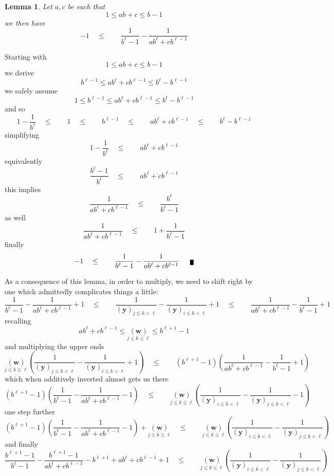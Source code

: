 \documentclass[twoside]{article}
\renewcommand{\leq}{\ensuremath{\quad\le\qquad}}
\newcommand{\bradix}[2][u]{\ensuremath{\underset{#2}{(\bm{#1})}}}
\newcommand{\denom}[3][y]{\ensuremath{(\bm{#1})_{#2\le k <  #3}}}
\newtheorem{lemma}{Lemma}[section]
\newenvironment{proof}[1][Proof]{\begin{trivlist}
\item[\hskip \labelsep {\bfseries #1}]}{\end{trivlist}}
\newcommand{\qed}{\nobreak \ifvmode \relax \else
      \ifdim\lastskip<1.5em \hskip-\lastskip
      \hskip1.5em plus0em minus0.5em \fi \nobreak
      \vrule height0.5em width0.5em depth0.25em\fi}
\begin{document}
\newpage

\begin{lemma}
Let $ a,c $ be such that
$$ 1\le ab+c\le b-1 $$
we then have
$$ -1\leq\frac{1}{b^\ell-1}-\frac{1}{ab^\ell+cb^{\ell-1}} $$
\end{lemma}

\begin{proof}
Starting with
$$ 1\le ab+c\le b-1 $$
we derive
$$ b^{\ell-1}\le ab^\ell+cb^{\ell-1}\le b^\ell-b^{\ell-1} $$
we safely assume
$$ 1\le b^{\ell-1}\le ab^\ell+cb^{\ell-1}\le b^\ell-b^{\ell-1} $$
and so
$$ 1-\frac{1}{b^\ell}\leq 1\leq b^{\ell-1}\leq ab^\ell+cb^{\ell-1}\leq b^\ell-b^{\ell-1} $$
simplifying
$$ 1-\frac{1}{b^\ell}\leq ab^\ell+cb^{\ell-1} $$
equivalently
$$ \frac{b^\ell-1}{b^\ell}\leq ab^\ell+cb^{\ell-1} $$
this implies
$$ \frac{1}{ab^\ell+cb^{\ell-1}}\leq \frac{b^\ell}{b^\ell-1} $$
as well
$$ \frac{1}{ab^\ell+cb^{\ell-1}}\leq 1+\frac{1}{b^\ell-1} $$
finally
$$ -1\leq \frac{1}{b^\ell-1}-\frac{1}{ab^\ell+cb^{\ell-1}}\qed $$
\end{proof}

As a consequence of this lemma, in order to multiply, we need to shift right by one which admittedly complicates things a little:
$$ \frac{1}{b^\ell-1}-\frac{1}{ab^\ell+cb^{\ell-1}}+1
	\leq\frac{1}{\denom{j}{\ell}}-\frac{1}{\denom{i}{\ell}}+1
	\leq\frac{1}{ab^\ell+cb^{\ell-1}}-\frac{1}{b^\ell-1}+1 $$
recalling
$$ ab^\ell+cb^{\ell-1}\le\bradix[w]{j\le k\le\ell}\le b^{\ell+1}-1 $$
and multiplying the upper ends
$$ \bradix[w]{j\le k\le\ell}\left(\frac{1}{\denom{j}{\ell}}-\frac{1}{\denom{i}{\ell}}+1\right)
	\leq\left(b^{\ell+1}-1\right)\left(\frac{1}{ab^\ell+cb^{\ell-1}}-\frac{1}{b^\ell-1}+1\right) $$
which when additively inverted almost gets us there
$$ \left(b^{\ell+1}-1\right)\left(\frac{1}{b^\ell-1}-\frac{1}{ab^\ell+cb^{\ell-1}}-1\right)
	\leq\bradix[w]{j\le k\le\ell}\left(\frac{1}{\denom{i}{\ell}}-\frac{1}{\denom{j}{\ell}}-1\right) $$
one step further
$$ \left(b^{\ell+1}-1\right)\left(\frac{1}{b^\ell-1}-\frac{1}{ab^\ell+cb^{\ell-1}}-1\right)+\bradix[w]{j\le k\le\ell}
	\leq\bradix[w]{j\le k\le\ell}\left(\frac{1}{\denom{i}{\ell}}-\frac{1}{\denom{j}{\ell}}\right) $$
and finally
$$ \frac{b^{\ell+1}-1}{b^\ell-1}-\frac{b^{\ell+1}-1}{ab^\ell+cb^{\ell-1}}-b^{\ell+1}+ab^\ell+cb^{\ell-1}+1
	\leq\bradix[w]{j\le k\le\ell}\left(\frac{1}{\denom{i}{\ell}}-\frac{1}{\denom{j}{\ell}}\right) $$
\end{document}
